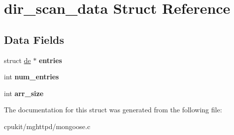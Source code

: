 \hypertarget{structdir__scan__data}{}\section{dir\+\_\+scan\+\_\+data Struct Reference}
\label{structdir__scan__data}
\subsection*{Data Fields}
\begin{DoxyCompactItemize}
\item 
\mbox{\label{structdir__scan__data_a73f628586095aed39889c1af9d717622}} 
struct \mbox{\hyperlink{structde}{de}} $\ast$ {\bfseries entries}
\item 
\mbox{\label{structdir__scan__data_a01ceadbfc34a85dc739998238fb2816e}} 
int {\bfseries num\+\_\+entries}
\item 
\mbox{\label{structdir__scan__data_a8fd471b754dde38d8219a135a45a86a8}} 
int {\bfseries arr\+\_\+size}
\end{DoxyCompactItemize}


The documentation for this struct was generated from the following file\+:\begin{DoxyCompactItemize}
\item 
cpukit/mghttpd/mongoose.\+c\end{DoxyCompactItemize}
